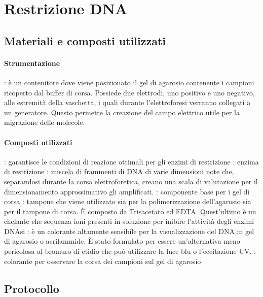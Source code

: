 \section{Restrizione DNA}
\subsection{Materiali e composti utilizzati}
\paragraph{Strumentazione}
\begin{itemize}[person]
	: è un contenitore dove viene posizionato il gel di agarosio contenente i campioni ricoperto dal buffer di corsa. Possiede due elettrodi, uno positivo e uno negativo, alle estremità della vaschetta, i quali durante l'elettroforesi verranno collegati a un generatore. Questo permette la creazione del campo elettrico utile per la migrazione delle molecole.
\end{itemize}

\paragraph{Composti utilizzati}
\begin{itemize}[person]
	\itemb[Buffer 10X]: garantisce le condizioni di reazione ottimali per gli enzimi di restrizione
	\itemb[DNA]
	: enzima di restrizione
	: miscela di frammenti di DNA di varie dimensioni note che, separandosi durante la corsa elettroforetica, creano una scala di valutazione per il dimensionamento approssimativo gli amplificati.
	\itemb[Agarosio]: componente base per i gel di corsa
	\itemb[TAE 50X]: tampone che viene utilizzato sia per la polimerizzazione dell'agarosio sia per il tampone di corsa. È composto da Trisacetato ed EDTA. Quest'ultimo è un chelante che sequenza ioni  presenti in soluzione per inibire l'attività degli enzimi DNAsi
	\itemb[SyberSafe]: è un colorante altamente sensibile per la visualizzazione del DNA in gel di agarosio o acrilammide. È stato formulato per essere un'alternativa meno pericolosa al bromuro di etidio che può utilizzare la luce blu o l'eccitazione UV.
	: colorante per osservare la corsa dei campioni sul gel di agarosio
\end{itemize}

\subsection{Protocollo}
